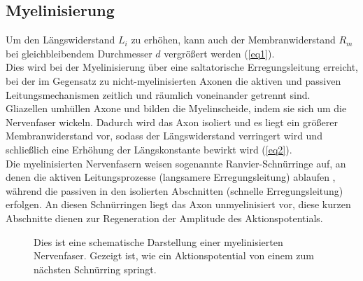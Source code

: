 \documentclass[11pt]{article}
\begin{document}
\subsection{Myelinisierung}
Um den Längswiderstand $L_i$ zu erhöhen, kann auch der Membranwiderstand $R_m$ bei gleichbleibendem Durchmesser $d$ vergrößert werden (\vref*{eq1}). \\
Dies wird bei der Myelinisierung über eine saltatorische Erregungsleitung erreicht, bei der im Gegensatz zu nicht-myelinisierten Axonen die aktiven und passiven Leitungsmechanismen zeitlich und räumlich voneinander getrennt sind. \\
Gliazellen umhüllen Axone und bilden die Myelinscheide, indem sie sich um die Nervenfaser wickeln. Dadurch wird das Axon isoliert und es liegt ein größerer Membranwiderstand vor, sodass der Längswiderstand verringert wird und schließlich eine Erhöhung der Längskonstante bewirkt wird (\vref*{eq2}). \\
Die myelinisierten Nervenfasern weisen sogenannte Ranvier-Schnürringe auf, an denen die aktiven Leitungsprozesse (langsamere Erregungsleitung) ablaufen , während die passiven in den isolierten Abschnitten (schnelle Erregungsleitung) erfolgen. An diesen Schnürringen liegt das Axon unmyelinisiert vor, diese kurzen Abschnitte dienen zur Regeneration der Amplitude des Aktionspotentials. \cite{physiologie}

\begin{figure}[H]
\caption{Dies ist eine schematische Darstellung einer myelinisierten Nervenfaser. Gezeigt ist, wie ein Aktionspotential von einem zum nächsten Schnürring \glqq springt\grqq{}. }
\label{myelin}
\end{figure}
\end{document}
